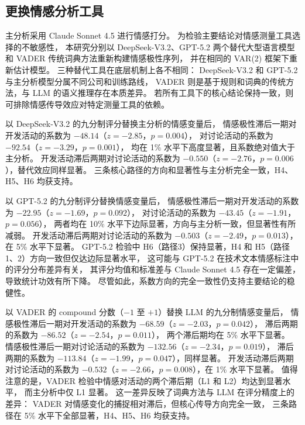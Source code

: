 \documentclass[
    type = master, %
    degree = professional,        %
    decl-page,  %
    twoside,                %
    fontset = fandol %
  ]{njuthesis}
\begin{document}
\subsection{更换情感分析工具}

主分析采用 Claude Sonnet 4.5 进行情感打分。
为检验主要结论对情感测量工具选择的不敏感性，
本研究分别以 DeepSeek-V3.2、GPT-5.2 两个替代大型语言模型
和 VADER 传统词典方法\cite{hutto2014vader}重新构建情感极性序列，
并在相同的 VAR(2) 框架下重新估计模型。
三种替代工具在底层机制上各不相同：
DeepSeek-V3.2 和 GPT-5.2 与主分析模型分属不同公司和训练路线，
VADER 则是基于规则和词典的传统方法，与 LLM 的语义推理存在本质差异。
若所有工具下的核心结论保持一致，则可排除情感传导效应对特定测量工具的依赖。

以 DeepSeek-V3.2 的九分制评分替换主分析的情感变量后，
情感极性滞后一期对开发活动的系数为
$-48.14$（$z = -2.85$，$p = 0.004$），
对讨论活动的系数为 $-92.54$（$z = -3.29$，$p = 0.001$），
均在 1\% 水平下高度显著，且系数绝对值大于主分析。
开发活动滞后两期对讨论活动的系数为
$-0.550$（$z = -2.76$，$p = 0.006$），替代效应同样显著。
三条核心路径的方向和显著性与主分析完全一致，H4、H5、H6 均获支持。

以 GPT-5.2 的九分制评分替换情感变量后，
情感极性滞后一期对开发活动的系数为
$-22.95$（$z = -1.69$，$p = 0.092$），
对讨论活动的系数为 $-43.45$（$z = -1.91$，$p = 0.056$），
两者均在 10\% 水平下边际显著，方向与主分析一致，但显著性有所减弱。
开发活动滞后两期对讨论活动的系数为
$-0.503$（$z = -2.49$，$p = 0.013$），在 5\% 水平下显著。
GPT-5.2 检验中 H6（路径3）保持显著，H4 和 H5（路径1、2）方向一致但仅达边际显著水平，
这可能与 GPT-5.2 在技术文本情感标注中的评分分布差异有关，
其评分均值和标准差与 Claude Sonnet 4.5 存在一定偏差，导致统计功效有所下降。
尽管如此，系数方向的完全一致性仍支持主要结论的稳健性。

以 VADER 的 compound 分数（$-1$ 至 $+1$）替换 LLM 的九分制情感变量后，
情感极性滞后一期对开发活动的系数为
$-68.59$（$z = -2.03$，$p = 0.042$），
滞后两期的系数为 $-86.52$（$z = -2.54$，$p = 0.011$），
两个滞后期均在 5\% 水平下显著。
情感极性滞后一期对讨论活动的系数为
$-132.56$（$z = -2.34$，$p = 0.019$），
滞后两期的系数为 $-113.84$（$z = -1.99$，$p = 0.047$），同样显著。
开发活动滞后两期对讨论活动的系数为
$-0.532$（$z = -2.66$，$p = 0.008$），在 1\% 水平下显著。
值得注意的是，VADER 检验中情感对活动的两个滞后期（L1 和 L2）均达到显著水平，
而主分析中仅 L1 显著。
这一差异反映了词典方法与 LLM 在评分精度上的差异：
VADER 对情感变化的捕捉相对滞后，但核心传导方向完全一致，
三条路径在 5\% 水平下全部显著，H4、H5、H6 均获支持。
\end{document}
